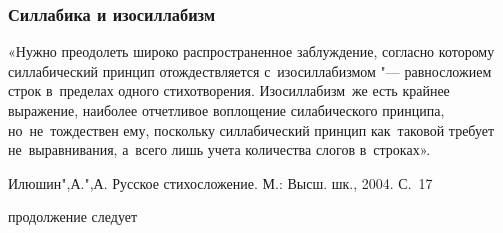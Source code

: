 \documentclass{beamer}
\begin{document}

\begin{frame}
\frametitle{Силлабика и изосиллабизм}

«Нужно преодолеть широко распространенное заблуждение, согласно которому силлабический принцип отождествляется с~изосиллабизмом "--- равносложием строк в~пределах одного стихотворения. Изосиллабизм~же есть крайнее выражение, наиболее отчетливое воплощение силабического принципа, но~не~тождествен ему, поскольку силлабический принцип как~таковой требует не~выравнивания, а~всего лишь учета количества слогов в~строках».

{\scriptsize Илюшин",А.",А. Русское стихосложение. М.: Высш. шк., 2004. С.~17}

\end{frame}





\begin{frame}
\Huge{\centerline{продолжение следует}}
\end{frame}
\end{document}
